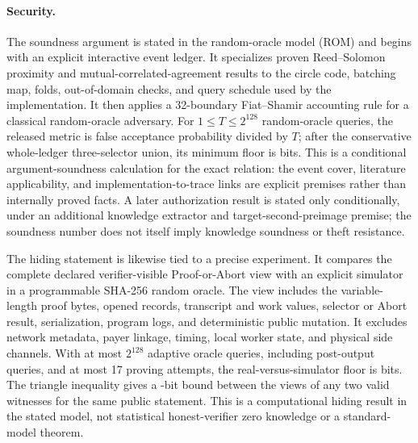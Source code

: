 \paragraph{Security.}
The soundness argument is stated in the random-oracle model (ROM) and begins
with an explicit interactive event ledger.  It
specializes proven Reed--Solomon proximity and mutual-correlated-agreement
results to the circle code, batching map, folds, out-of-domain checks, and
query schedule used by the implementation.  It then applies a 32-boundary
Fiat--Shamir accounting rule for a classical random-oracle adversary.  For
$1\leq T\leq 2^{128}$ random-oracle queries, the released metric is false
acceptance probability divided by $T$; after the conservative whole-ledger
three-selector union, its minimum floor is \ProfileSoundnessBits{} bits.  This
is a conditional argument-soundness calculation for the exact relation: the
event cover, literature applicability, and implementation-to-trace links are
explicit premises rather than internally proved facts.  A later
authorization result is stated only conditionally, under an additional
knowledge extractor and target-second-preimage premise; the soundness number
does not itself imply knowledge soundness or theft resistance.

The hiding statement is likewise tied to a precise experiment.  It compares
the complete declared verifier-visible Proof-or-Abort view with an explicit
simulator in a programmable SHA-256 random oracle.  The view includes the
variable-length proof bytes, opened records, transcript and work values,
selector or Abort result, serialization, program logs, and deterministic
public mutation.  It excludes network metadata, payer linkage, timing, local
worker state, and physical side channels.  With at most $2^{128}$ adaptive
oracle queries, including post-output queries, and at most 17 proving
attempts, the real-versus-simulator floor is \ProfileSimulationBits{} bits.
The triangle inequality gives a \ProfilePairwiseBits-bit bound between the
views of any two valid witnesses for the same public statement.  This is a
computational hiding result in the stated model, not statistical honest-verifier
zero knowledge or a standard-model theorem.

